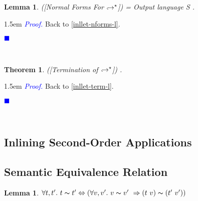 \documentclass[a4paper,11pt,oneside]{article}
\theoremstyle{plain}
\newtheorem{lemma}[definition]{Lemma}
\newtheorem{theorem}[definition]{Theorem}
\renewenvironment{proof}{\noindent \begin{adjustwidth}{1.5em}{} \textcolor{blue}{\textit{Proof.}}}
{{\begin{tiny}\textcolor{blue}{$\blacksquare$}\end{tiny}}
\end{adjustwidth}~\\\noindent}
\newcommand{\tmapp}[2]{(#1 ~ #2)}
\newcommand{\eqv}[1]{#1 \thicksim #1'}
\newcommand{\hookdownarrow}{\mathrel{\rotatebox[origin=c]{180}{$\hookleftarrow$}}}
\newcommand{\inlletarr}{\hookdownarrow}
\begin{document}
	
\begin{lemma}([Normal Forms For $\inlletarr^\star$]) = Output language S
 \label{inllet-nforms-p}.
\end{lemma}
\begin{proof}
Back to \ref{inllet-nforms-l}.
\end{proof}


\begin{theorem}([Termination of $\inlletarr^\star$])
\label{inllet-term-p}.
\end{theorem}
\begin{proof}
  Back to \ref{inllet-term-l}.
\end{proof}	
	
	
	
	\subsection{Inlining Second-Order Applications}



	\subsection{Semantic Equivalence Relation}
	\begin{lemma}
		$\forall t,t'.~ \eqv{t} \Leftrightarrow 
			(\forall v, v'.~\eqv{v}~\Rightarrow
			\tmapp{t}{v} \thicksim \tmapp{t'}{v'})$
	\label{equiv-def-p}
	\end{lemma}
\end{document}
